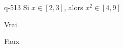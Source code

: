 \begin{truefalse}{q-513}
Si $x\in [2,3]$, alors $x^2\in [4,9]$
\item* Vrai
\item Faux
\end{truefalse}


